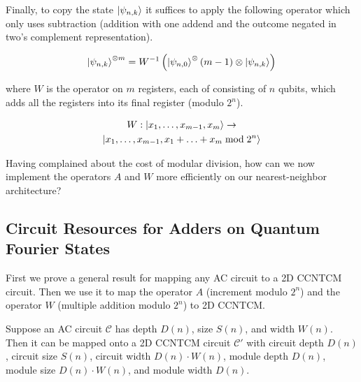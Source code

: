 Finally, to copy the state $\left\vert{\psi_{n,k}}\right\rangle$ it suffices to apply the following
operator which only uses subtraction (addition with one addend and the
outcome negated in two's complement representation).

\begin{equation*}
\left\vert{\psi_{n,k}}\right\rangle^{\otimes m} = W^{-1}\left( \left\vert{\psi_{n,0}}\right\rangle^\otimes(m-1) \otimes \left\vert{\psi_{n,k}}\right\rangle \right)
\end{equation*}

where $W$ is the operator on $m$ registers, each of consisting of $n$ qubits,
which adds all the registers into its final register (modulo $2^n$).

\begin{multline}
W : \left\vert{x_1,\ldots,x_{m-1},x_m}\right\rangle \rightarrow \\
 \left\vert{x_1,\ldots,x_{m-1},x_1+\ldots+x_m \bmod 2^n}\right\rangle
\end{multline}

Having complained about the cost of modular division, how can we now
implement the operators $A$ and $W$ more efficiently on our
nearest-neighbor architecture?

\subsection{Circuit Resources for Adders on Quantum Fourier States}

First we prove a general result for mapping any \textsf{AC} circuit
to a \textsf{2D CCNTCM} circuit.
Then we use it to 
map the operator $A$ (increment modulo $2^n$) and the operator
$W$ (multiple addition modulo $2^n$) to \textsf{2D CCNTCM}.

\begin{lemma}
Suppose an \textsf{AC} circuit $\mathcal{C}$ has
depth $D(n)$, size $S(n)$, and width $W(n)$. Then it can be mapped
onto a \textsf{2D CCNTCM} circuit $\mathcal{C'}$ with circuit depth
$D(n)$, circuit size $S(n)$, circuit width $D(n)\cdot W(n)$,
module depth $D(n)$, module size $D(n)\cdot W(n)$, and module width
$D(n)$.
\label{lem:ac-ccntcm}
\end{lemma}

